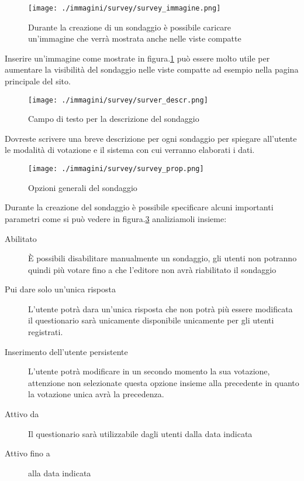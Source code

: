 \begin{figure}[H]
 \centering
 \texttt{[image: ./immagini/survey/survey\_immagine.png]}
 \caption{Durante la creazione di un sondaggio è possibile caricare un'immagine che verrà mostrata anche nelle viste compatte}
 \label{fig:survey_imm}
\end{figure}
 Inserire un'immagine come mostrate in figura.\ref{fig:survey_imm} può essere molto utile per aumentare la visibilità del sondaggio nelle viste compatte ad esempio nella pagina principale del sito.

\begin{figure}[H]
 \centering
 \texttt{[image: ./immagini/survey/surver\_descr.png]}
 \caption{Campo di testo per la descrizione del sondaggio}
 \label{fig:survey_descr}
\end{figure}
Dovreste scrivere una breve descrizione per ogni sondaggio per spiegare all'utente le modalità di votazione e il sistema con cui verranno elaborati i dati.
\begin{figure}[H]
 \centering
 \texttt{[image: ./immagini/survey/survey\_prop.png]}
 \caption{Opzioni generali del sondaggio}
 \label{fig:survey_opzioni}
\end{figure}

Durante la creazione del sondaggio è possibile specificare alcuni importanti parametri come si può vedere in figura.\ref{fig:survey_opzioni} analiziamoli insieme:
\begin{description}
 \item[Abilitato] È possibili disabilitare manualmente un sondaggio, gli utenti non potranno quindi più votare fino a che l'editore non avrà riabilitato il sondaggio
\item[Pui dare solo un'unica risposta] L'utente potrà dara un'unica risposta che non potrà più essere modificata il questionario sarà unicamente disponibile unicamente per gli utenti registrati.
\item[Inserimento dell'utente persistente]L'utente potrà modificare in un secondo momento  la sua votazione, attenzione non selezionate questa opzione insieme alla precedente in quanto la votazione unica avrà la precedenza.
\item[Attivo da]Il questionario sarà utilizzabile dagli utenti dalla data indicata
\item[Attivo fino a] alla data indicata
\end{description}

